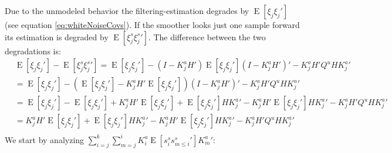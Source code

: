 \documentclass[oneside,12pt]{article}
\begin{document}
%
%
Due to the unmodeled behavior the filtering-estimation degrades by $\operatorname{E}[ \xi_j \xi_j' ]$ (see equation \ref{eq:whiteNoiseCovs}). If the smoother looks just one sample forward its estimation is degraded by $\operatorname{E}[\xi^s_{j}\xi^s_{j}']$. The difference between the two degradations is:
%
\begin{equation}
    \begin{split}
        &\operatorname{E}[ \xi_j \xi_j' ] - \operatorname{E}[\xi^s_{j}\xi^s_{j}'] = \operatorname{E}[ \xi_j \xi_j' ] - (I-K^a_j H') \operatorname{E}[ \xi_j \xi_j' ] (I-K^a_j H')' 
        - K^a_{j} H' Q^u H K^a_{j}'\\
        &= \operatorname{E}[ \xi_j \xi_j' ] - (\operatorname{E}[ \xi_j \xi_j' ] - K^a_j H'\operatorname{E}[ \xi_j \xi_j' ]) (I-K^a_j H')' 
        - K^a_{j} H' Q^u H K^a_{j}'\\
        &= \operatorname{E}[ \xi_j \xi_j' ] 
        - \operatorname{E}[ \xi_j \xi_j' ] + K^a_j H'\operatorname{E}[ \xi_j \xi_j' ]
        + \operatorname{E}[ \xi_j \xi_j' ] H K^a_j' - K^a_j H'\operatorname{E}[ \xi_j \xi_j' ] H K^a_j'
        - K^a_{j} H' Q^u H K^a_{j}'\\
        &= K^a_j H'\operatorname{E}[ \xi_j \xi_j' ]
        + \operatorname{E}[ \xi_j \xi_j' ] H K^a_j' - K^a_j H'\operatorname{E}[ \xi_j \xi_j' ] H K^a_j'
        - K^a_{j} H' Q^u H K^a_{j}'\\
    \end{split}
\end{equation}
%
%
We start by analyzing $\sum_{i=j}^{k} \sum_{m=j}^{i} K_i^a \operatorname{E}[ s^s_{i}  s^s_{m \leq i}' ] K_m^a' $:
%
\end{document}
